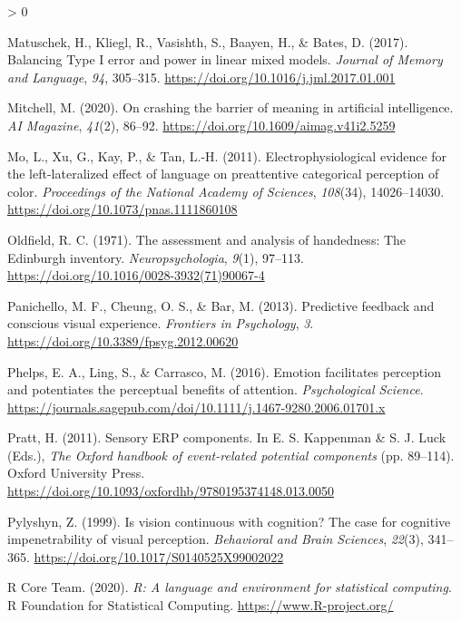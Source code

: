 \documentclass[
  english,
  doc,12pt,twoside,floatsintext]{apa7}
\newlength{\cslhangindent}
\newenvironment{CSLReferences}[2] %
 {%
  \setlength{\parindent}{0pt}
  \ifodd #1 \everypar{\setlength{\hangindent}{\cslhangindent}}\ignorespaces\fi
  \ifnum #2 > 0
  \setlength{\parskip}{#2\baselineskip}
  \fi
 }%
 {}
\begin{document}
\begin{CSLReferences}{1}{0}
\leavevmode\hypertarget{ref-matuschek2017}{}%
Matuschek, H., Kliegl, R., Vasishth, S., Baayen, H., \& Bates, D. (2017). Balancing {Type I} error and power in linear mixed models. \emph{Journal of Memory and Language}, \emph{94}, 305--315. \url{https://doi.org/10.1016/j.jml.2017.01.001}

\leavevmode\hypertarget{ref-mitchell2020}{}%
Mitchell, M. (2020). On crashing the barrier of meaning in artificial intelligence. \emph{AI Magazine}, \emph{41}(2), 86--92. \url{https://doi.org/10.1609/aimag.v41i2.5259}

\leavevmode\hypertarget{ref-mo2011}{}%
Mo, L., Xu, G., Kay, P., \& Tan, L.-H. (2011). Electrophysiological evidence for the left-lateralized effect of language on preattentive categorical perception of color. \emph{Proceedings of the National Academy of Sciences}, \emph{108}(34), 14026--14030. \url{https://doi.org/10.1073/pnas.1111860108}

\leavevmode\hypertarget{ref-oldfield1971}{}%
Oldfield, R. C. (1971). The assessment and analysis of handedness: The {Edinburgh} inventory. \emph{Neuropsychologia}, \emph{9}(1), 97--113. \url{https://doi.org/10.1016/0028-3932(71)90067-4}

\leavevmode\hypertarget{ref-panichello2013}{}%
Panichello, M. F., Cheung, O. S., \& Bar, M. (2013). Predictive feedback and conscious visual experience. \emph{Frontiers in Psychology}, \emph{3}. \url{https://doi.org/10.3389/fpsyg.2012.00620}

\leavevmode\hypertarget{ref-phelps2016}{}%
Phelps, E. A., Ling, S., \& Carrasco, M. (2016). Emotion facilitates perception and potentiates the perceptual benefits of attention. \emph{Psychological Science}. \url{https://journals.sagepub.com/doi/10.1111/j.1467-9280.2006.01701.x}

\leavevmode\hypertarget{ref-pratt2011}{}%
Pratt, H. (2011). Sensory ERP components. In E. S. Kappenman \& S. J. Luck (Eds.), \emph{The {Oxford handbook} of event-related potential components} (pp. 89--114). Oxford University Press. \url{https://doi.org/10.1093/oxfordhb/9780195374148.013.0050}

\leavevmode\hypertarget{ref-pylyshyn1999}{}%
Pylyshyn, Z. (1999). Is vision continuous with cognition? The case for cognitive impenetrability of visual perception. \emph{Behavioral and Brain Sciences}, \emph{22}(3), 341--365. \url{https://doi.org/10.1017/S0140525X99002022}

\leavevmode\hypertarget{ref-R-base}{}%
R Core Team. (2020). \emph{R: A language and environment for statistical computing}. R Foundation for Statistical Computing. \url{https://www.R-project.org/}


\end{CSLReferences}
\end{document}
